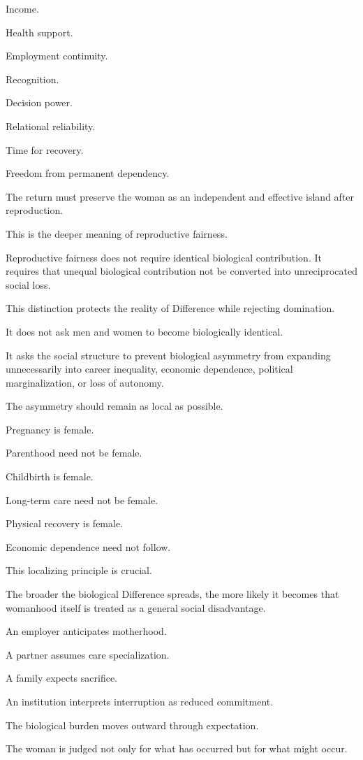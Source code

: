Income.

Health support.

Employment continuity.

Recognition.

Decision power.

Relational reliability.

Time for recovery.

Freedom from permanent dependency.

The return must preserve the woman as an independent and effective island after reproduction.

This is the deeper meaning of reproductive fairness.

Reproductive fairness does not require identical biological contribution. It requires that unequal biological contribution not be converted into unreciprocated social loss.

This distinction protects the reality of Difference while rejecting domination.

It does not ask men and women to become biologically identical.

It asks the social structure to prevent biological asymmetry from expanding unnecessarily into career inequality, economic dependence, political marginalization, or loss of autonomy.

The asymmetry should remain as local as possible.

Pregnancy is female.

Parenthood need not be female.

Childbirth is female.

Long-term care need not be female.

Physical recovery is female.

Economic dependence need not follow.

This localizing principle is crucial.

The broader the biological Difference spreads, the more likely it becomes that womanhood itself is treated as a general social disadvantage.

An employer anticipates motherhood.

A partner assumes care specialization.

A family expects sacrifice.

An institution interprets interruption as reduced commitment.

The biological burden moves outward through expectation.

The woman is judged not only for what has occurred but for what might occur.

